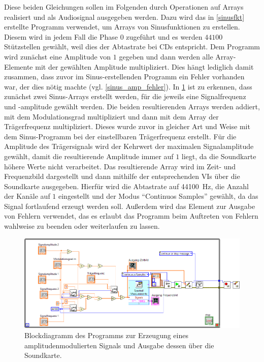 \documentclass[
a4paper,
12pt,
pagesize,
ngerman
]{scrartcl}
\begin{document}
	Diese beiden Gleichungen sollen im Folgenden durch Operationen auf Arrays realisiert und als Audiosignal ausgegeben werden.	
	Dazu wird das in \cref{sinusfkt} erstellte Programm verwendet, um Arrays von Sinusfunktionen zu erstellen.
	Diesem wird in jedem Fall die Phase $0$ zugeführt und es werden $44100$ Stützstellen gewählt, weil dies der Abtastrate bei CDs entspricht.
	Dem Programm wird zunächst eine Amplitude von $1$ gegeben und dann werden alle Array-Elemente mit der gewählten Amplitude multipliziert.
	Dies hängt lediglich damit zusammen, dass zuvor im Sinus-erstellenden Programm ein Fehler vorhanden war, der dies nötig machte (vgl. \cref{sinus_amp_fehler}).
	In \cref{fig_tag3_am_soundkarte_block} ist zu erkennen, dass zunächst zwei Sinus-Arrays erstellt werden, für die jeweils eine Signalfrequenz und -amplitude gewählt werden.
	Die beiden resultierenden Arrays werden addiert, mit dem Modulationsgrad multipliziert und dann mit dem Array der Trägerfrequenz multipliziert.
	Dieses wurde zuvor in gleicher Art und Weise mit dem Sinus-Programm bei der einstellbaren Trägerfrequenz erstellt.
	Für die Amplitude des Trägersignals wird der Kehrwert der maximalen Signalamplitude gewählt, damit die resultierende Amplitude immer auf $1$ liegt, da die Soundkarte höhere Werte nicht verarbeitet.
	Das resultierende Array wird im Zeit- und Frequenzbild dargestellt und dann mithilfe der entsprechenden VIs über die Soundkarte ausgegeben.
	Hierfür wird die Abtastrate auf \SI{44100}{\hertz}, die Anzahl der Kanäle auf $1$ eingestellt und der Modus \enquote{Continuos Samples} gewählt, da das Signal fortlaufend erzeugt werden soll.
	Außerdem wird das Element zur Ausgabe von Fehlern verwendet, das es erlaubt das Programm beim Auftreten von Fehlern wahlweise zu beenden oder weiterlaufen zu lassen. %
	
	\begin{figure}[H]  
		\includegraphics[width=1\textwidth]{EIRE2018Dateien/Tag3/Soundkarteoutoszi/AMd}
		\centering
		\caption{
			Blockdiagramm des Programms zur Erzeugung eines amplitudenmodulierten Signals und Ausgabe dessen über die Soundkarte.
		}
		\label{fig_tag3_am_soundkarte_block}
		\centering
	\end{figure}
	
\end{document}
